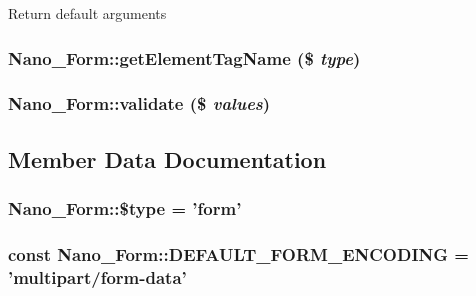 Return default arguments \hypertarget{classNano__Form_24c1ecefa8685c173cebb0676215e5a0}{
\subsubsection[{getElementTagName}]{\setlength{\rightskip}{0pt plus 5cm}Nano\_\-Form::getElementTagName (\$ {\em type})}}
\label{classNano__Form_24c1ecefa8685c173cebb0676215e5a0}


\hypertarget{classNano__Form_35783283818c41ff4e1917a66c258651}{
\subsubsection[{validate}]{\setlength{\rightskip}{0pt plus 5cm}Nano\_\-Form::validate (\$ {\em values})}}
\label{classNano__Form_35783283818c41ff4e1917a66c258651}




\subsection{Member Data Documentation}
\hypertarget{classNano__Form_c6b608a82ddd34cff161c5e34d384fea}{
\subsubsection[{\$type}]{\setlength{\rightskip}{0pt plus 5cm}Nano\_\-Form::\$type = 'form'}}
\label{classNano__Form_c6b608a82ddd34cff161c5e34d384fea}


\hypertarget{classNano__Form_878c4634a213832b49108d0c26ef05c3}{
\subsubsection[{DEFAULT\_\-FORM\_\-ENCODING}]{\setlength{\rightskip}{0pt plus 5cm}const {\bf Nano\_\-Form::DEFAULT\_\-FORM\_\-ENCODING} = 'multipart/form-data'}}
\label{classNano__Form_878c4634a213832b49108d0c26ef05c3}


